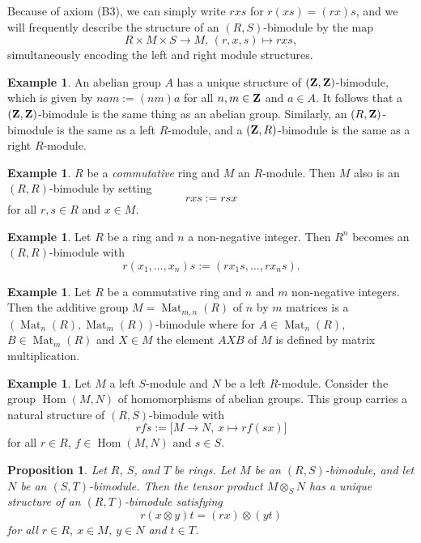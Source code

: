 \documentclass[11pt]{amsbook}
\DeclareMathOperator\Hom{Hom}
\DeclareMathOperator\Mat{Mat}
\theoremstyle{plain}
\newtheorem{proposition}[theorem]{Proposition}
\theoremstyle{definition}
\newtheorem{example}[theorem]{Example}
\begin{document}
Because of axiom (B3), we can simply write $rxs$ for $r(xs)=(rx)s$, and we will frequently describe the structure of an $(R,S)$-bimodule by the map
\[
	R\times M \times S \to M,\, (r,x,s) \mapsto rxs,
\]
simultaneously encoding the left and right module structures.

\begin{example}An abelian group $A$ has a unique structure of $({\mathbf{Z}},{\mathbf{Z}})$-bimodule, which is given by 
$nam := (nm)a$ for all $n,m\in {\mathbf{Z}}$ and $a\in A$. It follows that a $({\mathbf{Z}},{\mathbf{Z}})$-bimodule is the same thing as an abelian group. Similarly, an $(R,{\mathbf{Z}})$-bimodule is the same as a left $R$-module, and a $({\mathbf{Z}},R)$-bimodule is the same as a right $R$-module.
\end{example}

\begin{example}$R$ be a \emph{commutative} ring and $M$ an $R$-module. Then $M$ also is an $(R,R)$-bimodule by setting
\[
	rxs := rsx
\]
for all $r,s\in R$ and $x\in M$.
\end{example}

\begin{example}\label{exa:Rn-bimodule}
Let $R$ be a ring and $n$ a non-negative integer. Then $R^n$ becomes an $(R,R)$-bimodule with
\[
	r(x_1,\ldots, x_n)s := (rx_1s, \ldots, rx_ns).
\]
\end{example}

\begin{example}Let $R$ be a commutative ring and $n$ and $m$ non-negative integers. Then the additive group $M=\Mat_{m,n}(R)$ of $n$ by $m$ matrices is a $(\Mat_n(R),\Mat_m(R))$-bimodule where for $A\in \Mat_{n}(R)$, $B\in \Mat_{m}(R)$ and $X\in M$ the element $AXB$ of $M$ is defined by matrix multiplication.
\end{example}


\begin{example}\label{exa:Hom-bimodule}
Let $M$ a left $S$-module and $N$ be a left $R$-module. Consider the group $\Hom(M,N)$ of homomorphisms of abelian groups. This group carries a natural structure of $(R,S)$-bimodule with
\[
	rfs := \big[ M \to N,\, x \mapsto rf(sx) \big]
\] 
for all $r\in R$, $f\in \Hom(M,N)$ and $s\in S$.
\end{example}

\begin{proposition}
Let $R$, $S$, and $T$ be rings. Let $M$ be an $(R,S)$-bimodule, and let $N$ be an $(S,T)$-bimodule. Then the tensor product $M\otimes_S N$ has a unique structure of an $(R,T)$-bimodule satisfying
\[
	r(x\otimes y)t = (rx) \otimes (yt)
\]
for all $r\in R$, $x\in M$, $y\in N$ and  $t\in T$. 
\end{proposition}
\end{document}
